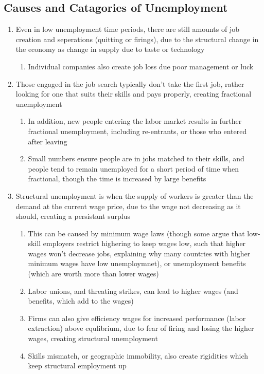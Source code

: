 \documentclass[11 pt, twoside]{article}
\begin{document}
\subsection{Causes and Catagories of Unemployment}
\begin{enumerate}
\item Even in low unemployment time periods, there are still amounts of job creation and seperations (quitting or firings), due to the structural change in the economy as change in supply due to taste or technology
\begin{enumerate}
\item Individual companies also create job loss due poor management or luck
\end{enumerate}
\item Those engaged in the job search typically don't take the first job, rather looking for one that suits their skills and pays properly, creating fractional unemployment
\begin{enumerate}
\item In addition, new people entering the labor market results in further fractional unemployment, including re-entrants, or those who entered after leaving
\item Small numbers ensure people are in jobs matched to their skills, and people tend to remain unemployed for a short period of time when fractional, though the time is increased by large benefits
\end{enumerate}
\item Structural unemployment is when the supply of workers is greater than the demand at the current wage price, due to the wage not decreasing as it should, creating a persistant surplus
\begin{enumerate}
\item This can be caused by minimum wage laws (though some argue that low-skill employers restrict highering to keep wages low, such that higher wages won't decrease jobs, explaining why many countries with higher minimum wages have low unemploymnet), or unemployment benefits (which are worth more than lower wages)
\item Labor unions, and threating strikes, can lead to higher wages (and benefits, which add to the wages)
\item Firms can also give efficiency wages for increased performance (labor extraction) above equlibrium, due to fear of firing and losing the higher wages, creating structural unemployment
\item Skills mismatch, or geographic immobility, also create rigidities which keep structural employment up

\end{enumerate}
\end{enumerate}
\end{document}
